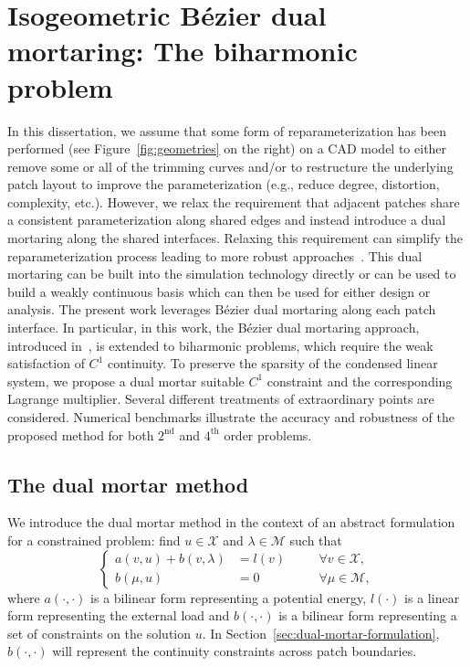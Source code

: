 \chapter{Isogeometric B\'ezier dual mortaring: The biharmonic problem}
\label{chp:chapter3}
\graphicspath{{figures/}{figures/chapter3/}}

In this dissertation, we assume that some form of reparameterization has been performed (see Figure~\ref{fig:geometries} on the right) on a CAD model to either remove some or all of the trimming curves and/or to restructure the underlying patch layout to improve the parameterization (e.g., reduce degree, distortion, complexity, etc.). However, we relax the requirement that adjacent patches share a consistent parameterization along shared edges and instead introduce a dual mortaring along the shared interfaces. Relaxing this requirement can simplify the reparameterization process leading to more robust approaches~\cite{xu2011parameterization}. This dual mortaring can be built into the simulation technology directly or can be used to build a weakly continuous basis which can then be used for either design or analysis. The present work leverages B\'ezier dual mortaring along each patch interface. In particular, in this work, the B\'ezier dual mortaring approach, introduced in~\cite{zou2018isogeometric}, is extended to biharmonic problems, which require the weak satisfaction of $C^1$ continuity. To preserve the sparsity of the condensed linear system, we propose a dual mortar suitable $C^1$ constraint and the corresponding Lagrange multiplier. Several different treatments of extraordinary points are considered. Numerical benchmarks illustrate the accuracy and robustness of the proposed method for both $2^\text{nd}$ and $4^\text{th}$ order problems.\par

\section{The dual mortar method}
\label{sec:dual-mortar-method}
We introduce the dual mortar method in the context of an abstract formulation for a constrained problem: find $u\in\mathcal{X}$ and $\lambda\in\mathcal{M}$ such that
\begin{equation}\label{eq:LM-form}
  \left\{\begin{alignedat}{2}
    a(v,u)+b(v,\lambda)&=l(v)\quad &&\forall{}v\in\mathcal{X},\\
    b(\mu,u)&=0\quad &&\forall{}\mu\in\mathcal{M},
  \end{alignedat}\right.
\end{equation}
where $a(\cdot,\cdot)$ is a bilinear form representing a potential energy, $l(\cdot)$ is a linear form representing the external load and $b(\cdot,\cdot)$ is a bilinear form representing a set of constraints on the solution $u$. In Section~\ref{sec:dual-mortar-formulation}, $b(\cdot,\cdot)$ will represent the continuity constraints across patch boundaries.

